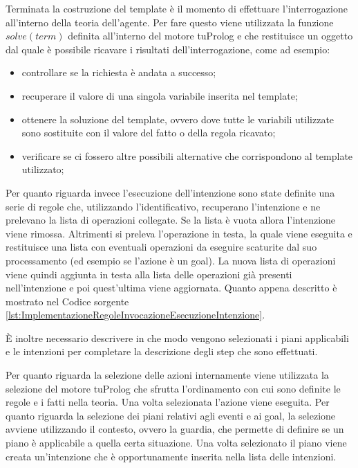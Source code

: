 Terminata la costruzione del template è il momento di effettuare l'interrogazione all'interno della teoria dell'agente. Per fare questo viene utilizzata la funzione $solve(term)$ definita all'interno del motore tuProlog e che restituisce un oggetto dal quale è possibile ricavare i risultati dell'interrogazione, come ad esempio:
\begin{itemize}
\item controllare se la richiesta è andata a successo;%
\item recuperare il valore di una singola variabile inserita nel template;%
\item ottenere la soluzione del template, ovvero dove tutte le variabili utilizzate sono sostituite con il valore del fatto o della regola ricavato;%
\item verificare se ci fossero altre possibili alternative che corrispondono al template utilizzato;%
\end{itemize}

Per quanto riguarda invece l'esecuzione dell'intenzione sono state definite una serie di regole che, utilizzando l'identificativo, recuperano l'intenzione e ne prelevano la lista di operazioni collegate. Se la lista è vuota allora l'intenzione viene rimossa. Altrimenti si preleva l'operazione in testa, la quale viene eseguita e restituisce una lista con eventuali operazioni da eseguire scaturite dal suo processamento (ed esempio se l'azione è un goal). La nuova lista di operazioni viene quindi aggiunta in testa alla lista delle operazioni già presenti nell'intenzione e poi quest'ultima viene aggiornata. Quanto appena descritto è mostrato nel Codice sorgente \ref{lst:ImplementazioneRegoleInvocazioneEsecuzioneIntenzione}.

È inoltre necessario descrivere in che modo vengono selezionati i piani applicabili e le intenzioni per completare la descrizione degli step che sono effettuati.

Per quanto riguarda la selezione delle azioni internamente viene utilizzata la selezione del motore tuProlog che sfrutta l'ordinamento con cui sono definite le regole e i fatti nella teoria. Una volta selezionata l'azione viene eseguita.
Per quanto riguarda la selezione dei piani relativi agli eventi e ai goal, la selezione avviene utilizzando il contesto, ovvero la guardia, che permette di definire se un piano è applicabile a quella certa situazione.
Una volta selezionato il piano viene creata un'intenzione che è opportunamente inserita nella lista delle intenzioni.

